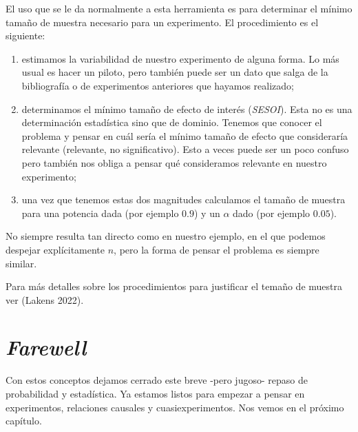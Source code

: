 \documentclass[
  letterpaper,
  DIV=11,
  numbers=noendperiod,
  oneside]{scrreprt}
\providecommand{\tightlist}{%
  \setlength{\itemsep}{0pt}\setlength{\parskip}{0pt}}\usepackage{longtable,booktabs,array}
\begin{document}
El uso que se le da normalmente a esta herramienta es para determinar el
mínimo tamaño de muestra necesario para un experimento. El
procedimiento es el siguiente:

\begin{enumerate}
\def\labelenumi{\arabic{enumi}.}
\tightlist
\item
  estimamos la variabilidad de nuestro experimento de alguna forma. Lo
  más usual es hacer un piloto, pero también puede ser un dato que salga
  de la bibliografía o de experimentos anteriores que hayamos realizado;
\item
  determinamos el mínimo tamaño de efecto de interés
  (\emph{SESOI}). Esta no es una determinación estadística sino que de
  dominio. Tenemos que conocer el problema y pensar en cuál sería el
  mínimo tamaño de efecto que consideraría relevante (relevante, no
  significativo). Esto a veces puede ser un poco confuso pero también
  nos obliga a pensar qué consideramos relevante en nuestro experimento;
\item
  una vez que tenemos estas dos magnitudes calculamos el tamaño de
  muestra para una potencia dada (por ejemplo \(0.9\)) y un \(\alpha\)
  dado (por ejemplo \(0.05\)).
\end{enumerate}

No siempre resulta tan directo como en nuestro ejemplo, en el que
podemos despejar explícitamente \(n\), pero la forma de pensar el
problema es siempre similar.

Para más detalles sobre los procedimientos para justificar el temaño de
muestra ver (Lakens
2022).

\hypertarget{farewell}{%
\section{\texorpdfstring{\emph{Farewell}}{Farewell}}\label{farewell}}

Con estos conceptos dejamos cerrado este breve -pero jugoso- repaso de
probabilidad y estadística. Ya estamos listos para empezar a pensar en
experimentos, relaciones causales y cuasiexperimentos. Nos vemos en el
próximo capítulo.
\end{document}
